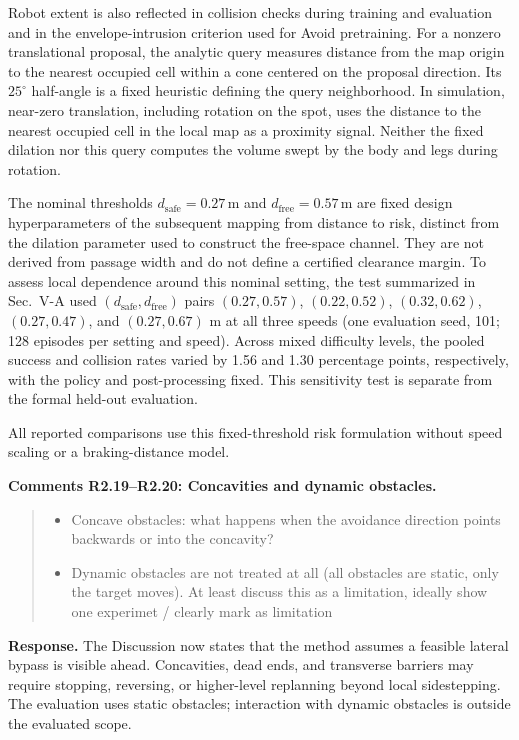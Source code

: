 \documentclass[letterpaper,11pt]{article}
\begin{document}
Robot extent is also reflected in collision checks during training and evaluation and in the envelope-intrusion criterion used for Avoid pretraining. For a nonzero translational proposal, the analytic query measures distance from the map origin to the nearest occupied cell within a cone centered on the proposal direction. Its $25^\circ$ half-angle is a fixed heuristic defining the query neighborhood. In simulation, near-zero translation, including rotation on the spot, uses the distance to the nearest occupied cell in the local map as a proximity signal. Neither the fixed dilation nor this query computes the volume swept by the body and legs during rotation.

The nominal thresholds $d_{\mathrm{safe}}=0.27\,\mathrm{m}$ and $d_{\mathrm{free}}=0.57\,\mathrm{m}$ are fixed design hyperparameters of the subsequent mapping from distance to risk, distinct from the dilation parameter used to construct the free-space channel. They are not derived from passage width and do not define a certified clearance margin. To assess local dependence around this nominal setting, the test summarized in Sec.~V-A used $(d_{\mathrm{safe}},d_{\mathrm{free}})$ pairs $(0.27,0.57)$, $(0.22,0.52)$, $(0.32,0.62)$, $(0.27,0.47)$, and $(0.27,0.67)$ m at all three speeds (one evaluation seed, 101; 128 episodes per setting and speed). Across mixed difficulty levels, the pooled success and collision rates varied by 1.56 and 1.30 percentage points, respectively, with the policy and post-processing fixed. This sensitivity test is separate from the formal held-out evaluation.

All reported comparisons use this fixed-threshold risk formulation without speed scaling or a braking-distance model.
\par\nopagebreak[4]

\noindent\textbf{Comments R2.19--R2.20: Concavities and dynamic obstacles.}
\begin{quote}\color{reviewgray}
\begin{itemize}[leftmargin=*,nosep,label={}]
\item[\textbf{R2.19.}] Concave obstacles: what happens when the avoidance direction points backwards or into the concavity?
\item[\textbf{R2.20.}] Dynamic obstacles are not treated at all (all obstacles are static, only the target moves). At least discuss this as a limitation, ideally show one experimet / clearly mark as limitation
\end{itemize}
\end{quote}
\noindent\textbf{Response.}
The Discussion now states that the method assumes a feasible lateral bypass is visible ahead. Concavities, dead ends, and transverse barriers may require stopping, reversing, or higher-level replanning beyond local sidestepping. The evaluation uses static obstacles; interaction with dynamic obstacles is outside the evaluated scope.
\par\nopagebreak[4]
\end{document}
